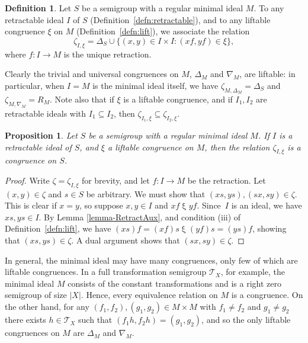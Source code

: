 \documentclass[11pt,a4paper]{article}
\newcommand{\T}{\mathcal T}
\newcommand{\De}{\Delta}
\newcommand{\set}[2]{\{ {#1} : {#2} \}}
\newcommand{\1}{\id_n}
\newcommand{\sub}{\subseteq}
\newcommand{\pf}{\begin{proof}}
\newcommand{\epf}{\end{proof}}
\numberwithin{equation}{section}
\newtheorem{prop}[equation]{Proposition}
\theoremstyle{definition}
\newtheorem{rem}[equation]{Remark}
\newtheorem{defn}[equation]{Definition}
\begin{document}
\begin{defn}\label{defn:lift2}
Let $S$ be a semigroup with a regular minimal ideal $M$.  To any retractable ideal $I$ of $S$ (Definition~\ref{defn:retractable}), and to any liftable congruence $\xi$ on $M$ (Definition~\ref{defn:lift}), we
associate the relation
\[
  \zeta_{I,\xi}=\De_S\cup\set{(x,y)\in I\times I}{(xf,yf) \in \xi},
\]
where $f:I\to M$ is the unique retraction.
\end{defn}

Clearly the trivial and universal congruences on $M$, $\De_M$ and $\nabla_M$, are liftable: in particular, when $I=M$ is the minimal ideal itself, we have $\zeta_{M,\De_M} = \De_S$ and $\zeta_{M,\nabla_M}=R_M$.  Note also that if $\xi$ is a liftable congruence, and if $I_1,I_2$ are retractable ideals with $I_1\sub I_2$, then $\zeta_{I_1,\xi}\sub\zeta_{I_2,\xi}$.

\begin{prop}\label{prop:lift}
Let $S$ be a semigroup with a regular minimal ideal $M$.  If $I$ is a retractable ideal of $S$, and $\xi$ a liftable congruence on $M$, then the relation $\zeta_{I,\xi}$ is a congruence on $S$.
\end{prop}

\pf Write $\zeta=\zeta_{I,\xi}$ for brevity, and let $f:I\to M$ be the retraction.  Let $(x,y)\in\zeta$ and $s\in S$ be
arbitrary.  We must show that $(xs,ys),(sx,sy)\in\zeta$.  This is clear if
$x=y$, so suppose $x,y\in I$ and $xf\mathrel\xi yf$.  Since~$I$ is an
ideal, we have $xs,ys\in I$.  By Lemma \ref{lemma-RetractAux}, and condition (iii) of Definition~\ref{defn:lift}, we have $(xs)f = (xf)s \mathrel\xi
(yf)s = (ys)f$, showing that $(xs,ys)\in\zeta$.  A dual argument shows that
$(sx,sy)\in\zeta$. 
\epf

In general, the minimal ideal may have many congruences, only few of which are liftable congruences. 
%
In a full transformation
semigroup $\T_X$, for example, the minimal ideal $M$ consists of the
constant transformations and is a right zero semigroup of size $|X|$. Hence, every
equivalence relation on $M$ is a congruence. On the other hand, for any $(f_1,
f_2), (g_1,g_2)\in M \times M$ with $f_1\not = f_2$ and $g_1 \not =g_2$  
there exists $h\in \T_X$ such that $(f_1h, f_2h) = (g_1,g_2)$, and so 
the only liftable congruences on $M$ are $\De_M$ and $\nabla_M$. 
\end{document}
